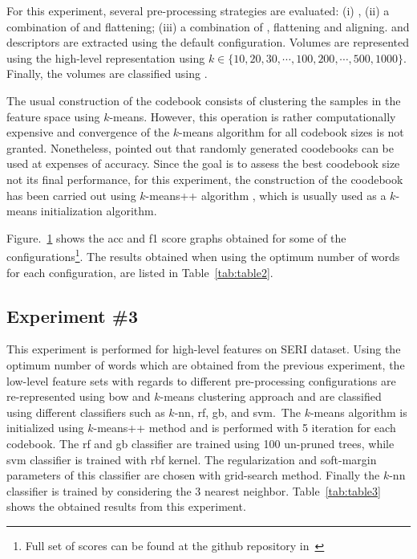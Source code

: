 For this experiment, several pre-processing strategies are evaluated: (i) \nlm, (ii) a combination of \nlm and flattening; (iii) a combination of \nlm, flattening and aligning.
\lbp and \lbptop descriptors are extracted using the default configuration.
Volumes are represented using the high-level representation \bow using $k \in \{10, 20, 30, \cdots, 100, 200, \cdots, 500, 1000\}$.
Finally, the volumes are classified using \lr.


The usual construction of the codebook consists of clustering the samples in
the feature space using $k$-means. However, this operation is rather
computationally expensive and convergence of the $k$-means algorithm for all
codebook sizes is not granted.
Nonetheless, \citeauthor{nowak2006sampling} pointed out that randomly generated coodebooks can be used at expenses of accuracy.
Since the goal is to assess the best coodebook size not its final performance, for this experiment, the construction of the coodebook has been carried out using $k$-means++ algorithm , which is usually used as a $k$-means initialization algorithm.

Figure.~\ref{fig:RBOW} shows the \ac{acc} and \ac{f1} score graphs obtained for some of the configurations\footnote{Full set of scores can be found at the github repository in~\cite{Lemaitre2015}}.
The results obtained when using the optimum number of words for each configuration, are listed in Table~\ref{tab:table2}.

\begin{figure}[t]
  \caption{}
  \label{fig:RBOW}
\end{figure}






\subsection{Experiment \#3}\label{subsec:exp3}
This experiment is performed for high-level features on SERI dataset.
Using the optimum number of words which are obtained from the previous experiment, the low-level feature sets with regards to different pre-processing configurations are re-represented using \ac{bow} and $k$-means clustering approach and are classified using different classifiers such as $k$-\ac{nn}, \ac{rf}, \ac{gb}, and \ac{svm}.\
The $k$-means algorithm is initialized using $k$-means++ method and is performed with 5 iteration for each codebook.
The \ac{rf} and \ac{gb} classifier are trained using 100 un-pruned trees, while \ac{svm} classifier is trained with \ac{rbf} kernel.
The regularization and soft-margin parameters of this classifier are chosen with grid-search method.
Finally the $k$-\ac{nn} classifier is trained by considering the 3 nearest neighbor.
Table~\ref{tab:table3} shows the obtained results from this experiment.\\

